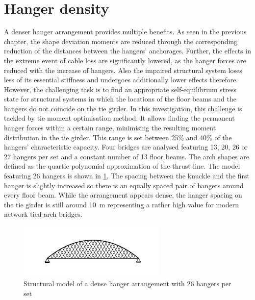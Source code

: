 \newpage
\section{Hanger density}
A denser hanger arrangement provides multiple benefits. As seen in the previous chapter, the shape deviation moments are reduced through the corresponding reduction of the distances between the hangers' anchorages. Further, the effects in the extreme event of cable loss are significantly lowered, as the hanger forces are reduced with the increase of hangers. Also the impaired structural system loses less of its essential stiffness and undergoes additionally lower effects therefore. However, the challenging task is to find an appropriate self-equilibrium stress state for structural systems in which the locations of the floor beams and the hangers do not coincide on the tie girder. 
In this investigation, this challenge is tackled by tie moment optimisation method. It allows finding the permanent hanger forces within a certain range, minimising the resulting moment distribution in the tie girder. This range is set between 25\% and 40\% of the hangers' characteristic capacity.  Four bridges are analysed featuring 13, 20, 26 or 27 hangers per set and a constant number of 13 floor beams. The arch shapes are defined as the quartic polynomial approximation of the thrust line. The model featuring 26 hangers is shown in \cref{fig:structure_26}. The spacing between the knuckle and the first hanger is slightly increased so there is an equally spaced pair of hangers around every floor beam. While the arrangement appears dense, the hanger spacing on the tie girder is still around \SI{10}{m} representing a rather high value for modern network tied-arch bridges.

\begin{figure}[H]
    \centering
    \includegraphics[trim={0 1cm 0 1cm},clip, width=0.65\textwidth]{calculations/hanger amount comparison/structure_26.png}
    \caption{Structural model of a dense hanger arrangement with 26 hangers per set}
    \label{fig:structure_26}
\end{figure}

